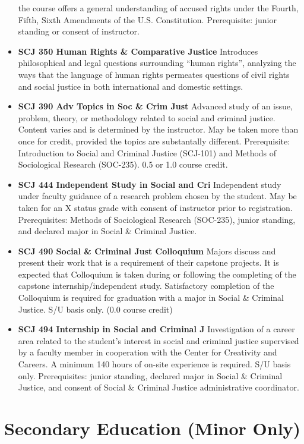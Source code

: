 \documentclass[
  letterpaper,
]{scrbook}
\begin{document}
\begin{itemize}
  the course offers a general understanding of accused rights under the
  Fourth, Fifth, Sixth Amendments of the U.S. Constitution.
  Prerequisite: junior standing or consent of instructor.\\
\item
  \textbf{SCJ 350 Human Rights \& Comparative Justice} Introduces
  philosophical and legal questions surrounding ``human rights'',
  analyzing the ways that the language of human rights permeates
  questions of civil rights and social justice in both international and
  domestic settings.
\item
  \textbf{SCJ 390 Adv Topics in Soc \& Crim Just} Advanced study of an
  issue, problem, theory, or methodology related to social and criminal
  justice. Content varies and is determined by the instructor. May be
  taken more than once for credit, provided the topics are substantally
  different. Prerequisite: Introduction to Social and Criminal Justice
  (SCJ-101) and Methods of Sociological Research (SOC-235). 0.5 or 1.0
  course credit.\\
\item
  \textbf{SCJ 444 Independent Study in Social and Cri} Independent study
  under faculty guidance of a research problem chosen by the student.
  May be taken for an X status grade with consent of instructor prior to
  registration. Prerequisites: Methods of Sociological Research
  (SOC-235), junior standing, and declared major in Social \& Criminal
  Justice.
\item
  \textbf{SCJ 490 Social \& Criminal Just Colloquium} Majors discuss and
  present their work that is a requirement of their capstone projects.
  It is expected that Colloquium is taken during or following the
  completing of the capstone internship/independent study. Satisfactory
  completion of the Colloquium is required for graduation with a major
  in Social \& Criminal Justice. S/U basis only. (0.0 course credit)
\item
  \textbf{SCJ 494 Internship in Social and Criminal J} Investigation of
  a career area related to the student's interest in social and criminal
  justice supervised by a faculty member in cooperation with the Center
  for Creativity and Careers. A minimum 140 hours of on-site experience
  is required. S/U basis only. Prerequisites: junior standing, declared
  major in Social \& Criminal Justice, and consent of Social \& Criminal
  Justice administrative coordinator.
\end{itemize}

\section{Secondary Education (Minor
Only)}\label{secondary-education-minor-only}
\end{document}
